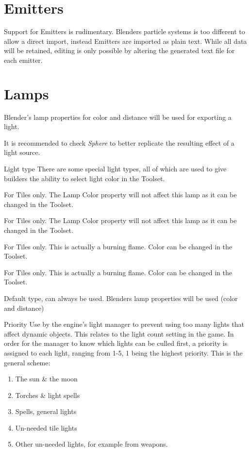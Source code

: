\section{Emitters}
Support for Emitters is rudimentary. Blenders particle systems is too
different to allow a direct import, instead Emitters are imported as plain
text. While all data will be retained, editing is only possible by altering the 
generated text file for each emitter.

\section{Lamps}
Blender's lamp properties for color and distance will be used for exporting a light.

It is recommended to check \textit{Sphere} to better replicate the resulting effect 
of a light source.

\begin{propertyAurora}{Light type}
There are some special light types, all of which are used to give builders
the ability to select light color in the Toolset.
\begin{description}[leftmargin=8em,style=nextline]
    \item[Mainlight 1] For Tiles only. The Lamp Color property will not affect this lamp as it can be changed in the Toolset.
    \item[Mainlight 2] For Tiles only. The Lamp Color property will not affect this lamp as it can be changed in the Toolset.
    \item[Sourcelight 1] For Tiles only. This is actually a burning flame. Color can be changed in the Toolset.
    \item[Sourcelight 2] For Tiles only. This is actually a burning flame. Color can be changed in the Toolset.
    \item[Default] Default type, can always be used. Blenders lamp properties will be used (color and distance)
\end{description}
\end{propertyAurora}

\begin{propertyAurora}{Priority}
Use by the engine's light manager to prevent using too many lights that affect dynamic 
objects. This relates to the light count setting in the game. In order for the manager 
to know which lights can be culled first, a priority is assigned to each light, ranging from 1-5, 
1 being the highest priority. This is the general scheme:
\begin{enumerate}
    \item The sun \& the moon
    \item Torches \& light spells
    \item Spells, general lights
    \item Un-needed tile lights
    \item Other un-needed lights, for example from weapons.
\end{enumerate}
\end{propertyAurora}

